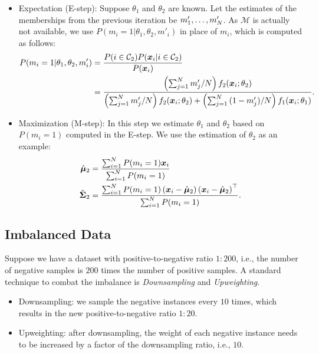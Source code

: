         \begin{itemize}
            \item Expectation (E-step): Suppose $\theta_1$ and $\theta_2$ are known. 
            Let the estimates of the memberships from the previous iteration be $m'_1, \ldots, m'_N$.
            As $\mathcal{M}$ is actually not available, we use $P(m_i=1 | \theta_1, \theta_2, m'_i)$ in place of $m_i$, which is computed as follows:
                \begin{equation}
                    \begin{aligned}
                    P(m_i=1 | \theta_1, \theta_2, m'_i) & = \frac{P(i \in \mathcal{C}_2) P(\bm{x}_i | i \in \mathcal{C}_2)}{P(\bm{x}_i)} \\
                    & = \frac{\left( \sum_{j=1}^{N}{m'_j} / N \right) f_2(\bm{x}_i; \theta_2)}{ \left( \sum_{j=1}^{N}{m'_j} / N \right) f_2(\bm{x}_i; \theta_2) + \left( \sum_{j=1}^{N}{(1-m'_j)} / N \right) f_1(\bm{x}_i; \theta_1) }.
                \end{aligned}
                \end{equation}
            \item Maximization (M-step): In this step we estimate $\theta_1$ and $\theta_2$ based on $P(m_i=1)$ computed in the E-step.
            We use the estimation of $\theta_2$ as an example:
                \begin{equation}
                    \begin{aligned}
                        \hat{\bm{\mu}}_2 & = \frac{\sum_{i=1}^{N}{P(m_i=1) \bm{x}_i}}{\sum_{i=1}^{N}{P(m_i=1)}}  \\
                        \hat{\bm{\Sigma}}_2 & = \frac{\sum_{i=1}^{N}{P(m_i=1)\left( \bm{x}_i -  \hat{\bm{\mu}}_2  \right)\left( \bm{x}_i -  \hat{\bm{\mu}}_2  \right)^\top}}{\sum_{i=1}^{N}{P(m_i=1)}}.
                    \end{aligned}
                \end{equation}
        \end{itemize}
    

\subsection{Imbalanced Data}
    Suppose we have a dataset with positive-to-negative ratio $1:200$, i.e., the number of negative samples is $200$ times the number of positive samples.
    A standard technique to combat the imbalance is \emph{Downsampling} and \emph{Upweighting}.
        \begin{itemize}
            \item Downsampling: we sample the negative instances every $10$ times, which results in the new positive-to-negative ratio $1:20$.
            \item Upweighting: after downsampling, the weight of each negative instance needs to be increased by a factor of the downsampling ratio, i.e., $10$.
        \end{itemize}
        
